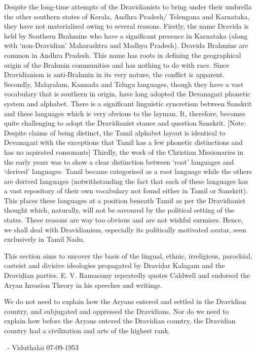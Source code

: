 Despite the long-time attempts of the Dravidianists to bring under their umbrella the other southern states of Kerala, Andhra Pradesh/ Telengana and Karnataka, they have not materialised owing to several reasons. Firstly, the name Dravida is held by Southern Brahmins who have a significant presence in Karnataka (along with ‘non-Dravidian’ Maharashtra and Madhya Pradesh). Dravida Brahmins are common in Andhra Pradesh. This name has roots in defining the geographical origin of the Brahmin communities and has nothing to do with race. Since Dravidianism is anti-Brahmin in its very nature, the conflict is apparent. Secondly, Malayalam, Kannada and Telugu languages, though they have a vast vocabulary that is southern in origin, have long adopted the Devanagari phonetic system and alphabet. There is a significant linguistic syncretism between Sanskrit and these languages which is very obvious to the layman. It, therefore, becomes quite challenging to adopt the Dravidianist stance and question Sanskrit. [Note: Despite claims of being distinct, the Tamil alphabet layout is identical to Devanagari with the exceptions that Tamil has a few phonetic distinctions and has no aspirated consonants] Thirdly, the work of the Christian Missionaries in the early years was to show a clear distinction between ‘root’ languages and ‘derived’ languages. Tamil became categorised as a root language while the others are derived languages (notwithstanding the fact that each of these languages has a vast repository of their own vocabulary not found either in Tamil or Sanskrit). This places these languages at a position beneath Tamil as per the Dravidianist thought which, naturally, will not be savoured by the political setting of the states. These reasons are way too obvious and are not wishful surmises. Hence, we shall deal with Dravidianism, especially its politically motivated avatar, seen exclusively in Tamil Nadu.

This section aims to uncover the basis of the lingual, ethnic, irreligious, parochial, casteist and divisive ideologies propagated by Draviḍar Kalagam and the Draviḍian parties. E. V. Ramasamy repeatedly quotes Caldwell and endorsed the Aryan Invasion Theory in his speeches and writings.

\begin{myquote}
We do not need to explain how the Aryans entered and settled in the Dravidian country, and subjugated and oppressed the Dravidians. Nor do we need to explain how before the Aryans entered the Dravidian country, the Dravidian country had a civilization and arts of the highest rank.

~\hfill - Viduthalai 07-09-1953
\end{myquote}

